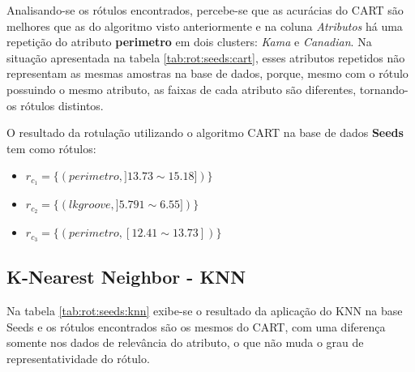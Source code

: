 

Analisando-se os rótulos encontrados, percebe-se que as acurácias do CART são melhores que as do algoritmo visto anteriormente e na coluna \textit{Atributos} há uma repetição do atributo \textbf{perimetro} em dois clusters: \textit{Kama} e \textit{Canadian}. Na situação apresentada na tabela \ref{tab:rot:seeds:cart}, esses atributos repetidos não representam as mesmas amostras na base de dados, porque, mesmo com o rótulo possuindo o mesmo atributo, as faixas de cada atributo são diferentes, tornando-os rótulos distintos. 

O resultado da rotulação utilizando o algoritmo CART na base de dados \textbf{Seeds} tem como rótulos: 
\begin{itemize}[noitemsep]
 \item ${r_{c_1}=\{ (perimetro, ]13.73 \sim 15.18]) \} }$
 \item ${r_{c_2}=\{ (lkgroove, ] 5.791 \sim  6.55]) \} }$
 \item ${r_{c_3}=\{ (perimetro, [12.41 \sim  13.73])\} }$
\end{itemize}


\subsection{K-Nearest Neighbor - KNN} \label{cap:resultados:ssec:seed:knn}


Na tabela \ref{tab:rot:seeds:knn} exibe-se o resultado da aplicação do KNN na base Seeds e os rótulos encontrados são os mesmos do CART, com uma diferença somente nos dados de relevância do atributo, o que não muda o grau de representatividade do rótulo. 

